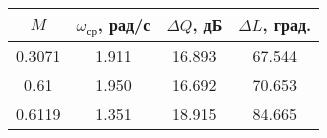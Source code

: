 \begin{tabular}{|c|c|c|c|}
\hline
   $M$ &  $\omega_{ср}$, рад/с &  $\Delta Q$, дБ &  $\Delta L$, град. \\
\hline
0.3071 &                 1.911 &          16.893 &             67.544 \\
  0.61 &                 1.950 &          16.692 &             70.653 \\
0.6119 &                 1.351 &          18.915 &             84.665 \\
\hline
\end{tabular}
